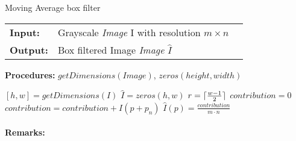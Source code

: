 \documentclass{paper}
\DeclarePairedDelimiter\ceil{\lceil}{\rceil}
\begin{document}
\begin{algorithm}[H]
\caption{Moving Average box filter}
\begin{table}[H]
  \begin{tabular}{@{}lll@{}}
    \textbf{Input:} & Grayscale \emph{Image} I with resolution $m \times n$  \\
    \textbf{Output:} & Box filtered Image \emph{Image} $\hat{I}$   \\
  \end{tabular} 
\end{table}
\textbf{Procedures:} $getDimensions(Image)$, $zeros(height, width)$  \\
\setlength{\fboxrule}{0pt} 
\begin{boxedminipage}{1.0\textwidth}
  \begin{algorithmic}[1]
      \State $ [h,w] = getDimensions(I)$
      \State $ \hat{I} = zeros(h,w)$
      \State $ r = \ceil{\frac{w-1}{2}}$
        \State $ contribution = 0$
            \State $ contribution = contribution + I(p+p_n)$
        \EndFor
        \State $ \hat{I}(p) = \frac{contribution}{m \cdot n}$
      \EndFor
  \end{algorithmic}
  \end{boxedminipage}
  \vskip1.5pt
\label{alg:boxfilter}
\end{algorithm}

\paragraph{Remarks:}
\end{document}
